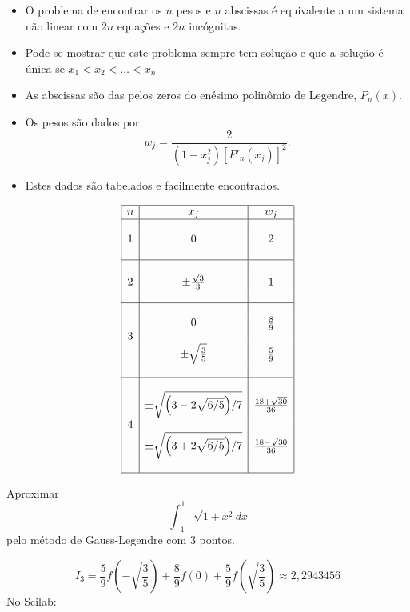 \begin{itemize}
\item O problema de encontrar os $n$ pesos e $n$ abscissas é equivalente a um sistema não linear com $2n$ equações e $2n$ incógnitas.
\item Pode-se mostrar que este problema sempre tem solução e que a solução é única se $x_1<x_2<\ldots <x_n$
\item As abscissas são das pelos zeros do enésimo polinômio de Legendre, $P_n(x)$.
\item Os pesos são dados por
$$w_j = \frac{2}{\left( 1-x_j^2 \right) [P'_n(x_j)]^2}.$$
\item Estes dados são tabelados e facilmente encontrados.
\end{itemize}

\begin{equation*}
  \begin{array}{|c|c|c|}
\hline
n&x_j&w_j\\
\hline
&&\\
1& 0 & 2\\
&&\\
\hline
&&\\
2& \pm \frac{\sqrt{3}}{3}&1\\
&&\\
\hline
&&\\
& 0&\frac{8}{9}\\
3&&\\
& \pm \sqrt{\frac{3}{5}}&\frac{5}{9}\\
&&\\
\hline
&&\\
&\pm\sqrt{\Big( 3 - 2\sqrt{6/5} \Big)/7}&\tfrac{18+\sqrt{30}}{36}\\
4&&\\
&\pm\sqrt{\Big( 3 + 2\sqrt{6/5} \Big)/7}&\tfrac{18-\sqrt{30}}{36}\\
&&\\
\hline
\end{array}
\end{equation*}

\begin{ex} Aproximar
  \begin{equation*}
    \int_{-1}^1\sqrt{1+x^2}dx  
  \end{equation*}
pelo método de Gauss-Legendre com 3 pontos.
\end{ex}
\begin{sol}
 \begin{equation*}
  I_3=\frac{5}{9}f\left(-\sqrt{\frac{3}{5}}\right)+\frac{8}{9}f(0)+\frac{5}{9}f\left(\sqrt{\frac{3}{5}}\right) \approx 2,2943456
\end{equation*}
\ifisscilab
No Scilab:

\fi 
\end{sol}

